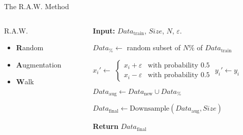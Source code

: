 \begin{frame}{The R.A.W. Method}
    \begin{columns}[T]
        
        \begin{column}{0.35\textwidth}
            \begin{block}{R.A.W.}
                \begin{itemize}\LARGE
                    \item \textbf{R}andom
                    \item \textbf{A}ugmentation
                    \item \textbf{W}alk
                \end{itemize}
            \end{block}
        \end{column}
        
        \vline\hspace{1em} 
        
        \begin{column}{0.60\textwidth}
            \begin{algorithm}[H]
                \caption{R.A.W. Pre-Processing Algorithm}
                \begin{algorithmic}[1]
                    \State \textbf{Input:} $Data_{\text{train}}$, $Size$, $N$, $\varepsilon$.
                    
                    \State $Data_{\%} \gets$ random subset of $N\%$ of $Data_{\text{train}}$
                    
                        \State $x_i' \gets$
                        \Statex \quad 
                        $\begin{cases}
                            x_i + \varepsilon & \text{with probability } 0.5 \\
                            x_i - \varepsilon & \text{with probability } 0.5
                        \end{cases}$
                        \State $y_i' \gets y_i$
                    \EndFor
                    
                    \State $Data_{\text{aug}} \gets Data_{\text{new}} \cup Data_{\%}$
                    
                    \State $Data_{\text{final}} \gets \text{Downsample}(Data_{\text{aug}}, Size)$
                    
                    \State \textbf{Return} $Data_{\text{final}}$
                \end{algorithmic}
            \end{algorithm}
        \end{column}
    \end{columns}
\end{frame}


